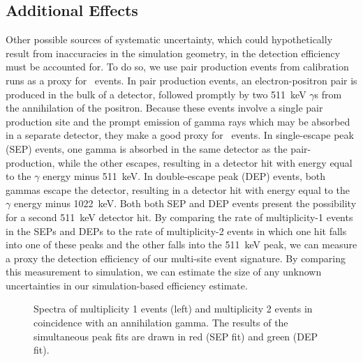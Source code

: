 \documentclass[/main.tex]{subfiles}
\begin{document}
\subsection{Additional Effects} \label{sec:Co56}
Other possible sources of systematic uncertainty, which could hypothetically result from inaccuracies in the simulation geometry, in the detection efficiency must be accounted for.
To do so, we use pair production events from calibration runs as a proxy for \bbes\ events.
In pair production events, an electron-positron pair is produced in the bulk of a detector, followed promptly by two 511~keV $\gamma$s from the annihilation of the positron.
Because these events involve a single pair production site and the prompt emission of gamma rays which may be absorbed in a separate detector, they make a good proxy for \bbes\ events.
In single-escape peak (SEP) events, one gamma is absorbed in the same detector as the pair-production, while the other escapes, resulting in a detector hit with energy equal to the $\gamma$ energy minus 511~keV.
In double-escape peak (DEP) events, both gammas escape the detector, resulting in a detector hit with energy equal to the $\gamma$ energy minus 1022~keV.
Both both SEP and DEP events present the possibility for a second 511~keV detector hit.
By comparing the rate of multiplicity-1 events in the SEPs and DEPs to the rate of multiplicity-2 events in which one hit falls into one of these peaks and the other falls into the 511~keV peak, we can measure a proxy the detection efficiency of our multi-site event signature.
By comparing this measurement to simulation, we can estimate the size of any unknown uncertainties in our simulation-based efficiency estimate.
\\
\begin{figure}[ht]
  \centering
  \caption[Spectra of multiplicty 1 and 2  data with peak fits]{\label{fig:Co56Spectra}
    Spectra of multiplicity 1  events (left) and multiplicity 2  events in coincidence with an annihilation gamma. The results of the simultaneous peak fits are drawn in red (SEP fit) and green (DEP fit).
  }
\end{figure}
\end{document}

